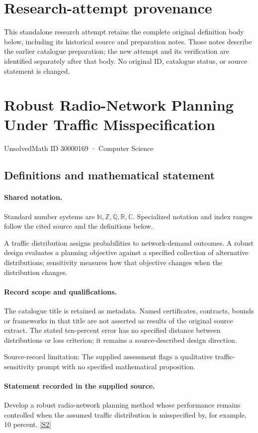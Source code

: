 \documentclass[11pt]{article}
\begin{document}
\section*{Research-attempt provenance}
This standalone research attempt retains the complete original definition body below,
including its historical source and preparation notes. Those notes describe the
earlier catalogue preparation; the new attempt and its verification are identified
separately after that body. No original ID, catalogue status, or source statement is changed.

\section{Robust Radio-Network Planning Under Traffic Misspecification}\label{30000169}
{\small UnsolvedMath ID 30000169 · Computer Science}
\subsection{Definitions and mathematical statement}

\paragraph{Shared notation.}Standard number systems are $\mathbb N,\mathbb Z,\mathbb Q,\mathbb R,\mathbb C$. Specialized notation and index ranges follow the cited source and the definitions below.


A traffic distribution assigns probabilities to network-demand outcomes. A robust design evaluates a planning objective against a specified collection of alternative distributions; sensitivity measures how that objective changes when the distribution changes.
\paragraph{Record scope and qualifications.}
The catalogue title is retained as metadata. Named certificates, contracts, bounds or frameworks in that title are not asserted as results of the original source extract.
The stated ten-percent error has no specified distance between distributions or loss criterion; it remains a source-described design direction.

Source-record limitation: The supplied assessment flags a qualitative traffic-sensitivity prompt with no specified mathematical proposition.
\paragraph{Statement recorded in the supplied source.}
Develop a robust radio-network planning method whose performance remains controlled when the assumed traffic distribution is misspecified by, for example, 10 percent. \href{https://doi.org/10.4171/owr/2005/02}{[S2]}
\end{document}
